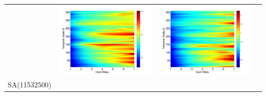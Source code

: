 \documentclass[review]{elsarticle}
\begin{document}
\begin{table}[H]
\begin{tabular}{cccc}
&\begin{minipage}{.3\textwidth}\includegraphics[width=\linewidth]{resultgraph/05585000pep.png}\end{minipage}
&\begin{minipage}{.3\textwidth}\includegraphics[width=\linewidth]{resultgraph/05585000pepq.png}\end{minipage}
\\
SA(11532500)

\end{tabular}
\end{table}
\end{document}
